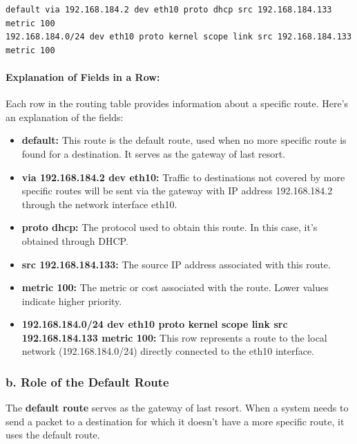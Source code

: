 \documentclass{report}
\begin{document}
\begin{verbatim}
default via 192.168.184.2 dev eth10 proto dhcp src 192.168.184.133 metric 100 
192.168.184.0/24 dev eth10 proto kernel scope link src 192.168.184.133 metric 100
\end{verbatim}

\paragraph*{Explanation of Fields in a Row:\\} 
Each row in the routing table provides information about a specific route. 
Here's an explanation of the fields:

\begin{itemize}
  \item \textbf{default:} This route is the default route, used when no more specific route is found for a destination. It serves as the gateway of last resort.

  \item \textbf{via 192.168.184.2 dev eth10:} Traffic to destinations not covered by more specific routes will be sent via the gateway with IP address 192.168.184.2 through the network interface eth10.

  \item \textbf{proto dhcp:} The protocol used to obtain this route. In this case, it's obtained through DHCP.

  \item \textbf{src 192.168.184.133:} The source IP address associated with this route.

  \item \textbf{metric 100:} The metric or cost associated with the route. Lower values indicate higher priority.

  \item \textbf{192.168.184.0/24 dev eth10 proto kernel scope link src 192.168.184.133 metric 100:} This row represents a route to the local network (192.168.184.0/24) directly connected to the eth10 interface.

\end{itemize}

\subsubsection*{b. Role of the Default Route}
The \textbf{default route} serves as the gateway of last resort.
When a system needs to send a packet to a destination for which it doesn't have a more specific route, it uses the default route. 
\end{document}

